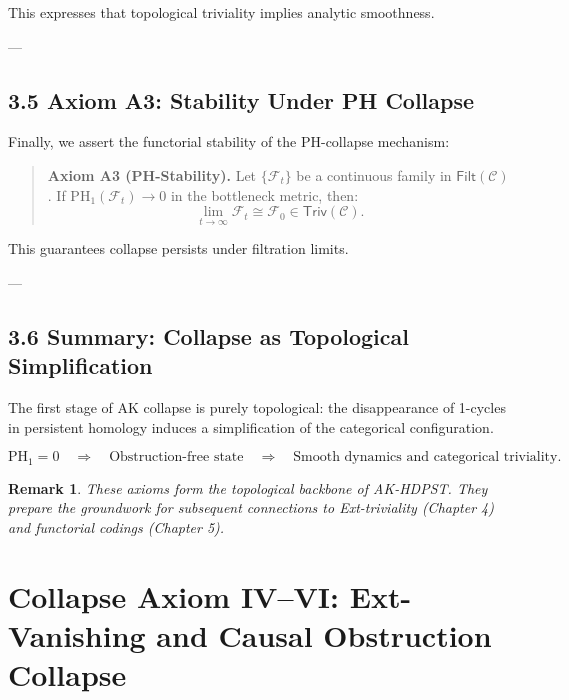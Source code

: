 \documentclass[11pt]{article}
\newtheorem{remark}[theorem]{Remark}
\begin{document}
This expresses that topological triviality implies analytic smoothness.

---

\subsection*{3.5 Axiom A3: Stability Under PH Collapse}

Finally, we assert the functorial stability of the PH-collapse mechanism:

\begin{quote}
\textbf{Axiom A3 (PH-Stability).}  
Let \( \{ \mathcal{F}_t \} \) be a continuous family in \( \mathsf{Filt}(\mathcal{C}) \).  
If \( \mathrm{PH}_1(\mathcal{F}_t) \to 0 \) in the bottleneck metric, then:
\[
\lim_{t \to \infty} \mathcal{F}_t \cong \mathcal{F}_0 \in \mathsf{Triv}(\mathcal{C}).
\]
\end{quote}

This guarantees collapse persists under filtration limits.

---

\subsection*{3.6 Summary: Collapse as Topological Simplification}

The first stage of AK collapse is purely topological:  
the disappearance of 1-cycles in persistent homology induces a simplification of the categorical configuration.

\[
\mathrm{PH}_1 = 0 
\quad \Longrightarrow \quad 
\text{Obstruction-free state} 
\quad \Longrightarrow \quad 
\text{Smooth dynamics and categorical triviality}.
\]

\begin{remark}
These axioms form the topological backbone of AK-HDPST.  
They prepare the groundwork for subsequent connections to Ext-triviality (Chapter 4)  
and functorial codings (Chapter 5).
\end{remark}



\section{Collapse Axiom IV–VI: Ext-Vanishing and Causal Obstruction Collapse}
\end{document}
